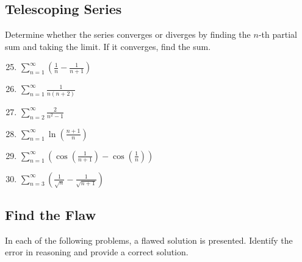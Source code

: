 \documentclass[12pt]{article}
\begin{document}
\subsection{Telescoping Series}
Determine whether the series converges or diverges by finding the $n$-th partial sum and taking the limit. If it converges, find the sum.

\begin{enumerate}
    \setcounter{enumi}{24}
    \item $\sum_{n=1}^\infty \left(\frac{1}{n} - \frac{1}{n+1}\right)$
    
    \item $\sum_{n=1}^\infty \frac{1}{n(n+2)}$
    
    \item $\sum_{n=2}^\infty \frac{2}{n^2 - 1}$
    
    \item $\sum_{n=1}^\infty \ln\left(\frac{n+1}{n}\right)$
    
    \item $\sum_{n=1}^\infty (\cos(\frac{1}{n+1}) - \cos(\frac{1}{n}))$
    
    \item $\sum_{n=3}^\infty \left(\frac{1}{\sqrt{n}} - \frac{1}{\sqrt{n+1}}\right)$
\end{enumerate}

\subsection{Find the Flaw}
In each of the following problems, a flawed solution is presented. Identify the error in reasoning and provide a correct solution.
\end{document}

